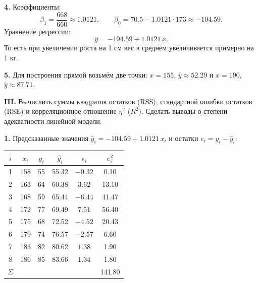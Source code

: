 \documentclass{article}
\begin{document}
    \textbf{4.} Коэффициенты:
    \[\beta_1=\frac{668}{660}\approx1.0121,\qquad \beta_0=70.5-1.0121\cdot173\approx-104.59.\]
    Уравнение регрессии:
    \[\hat y=-104.59+1.0121\,x.\]
    То есть при увеличении роста на 1 см вес в среднем увеличивается примерно на 1 кг.

    \textbf{5.} Для построения прямой возьмём две точки: $x=155$, $\hat y\approx52.29$ и $x=190$, $\hat y\approx87.71$.

    \begin{center}
    \end{center}

\begin{framed}
    \textbf{III.} Вычислить суммы квадратов остатков (RSS), стандартной ошибки остатков (RSE)
    и корреляционное отношение $\eta^2$ ($R^2$). Сделать выводы о степени адекватности линейной модели.
\end{framed}
    \textbf{1.} Предсказанные значения $\hat y_i=-104.59+1.0121\,x_i$ и остатки $e_i=y_i-\hat y_i$:
    \begin{center}
    \begin{tabular}{|c|c|c|c|c|c|}
        \hline
        $i$ & $x_i$ & $y_i$ & $\hat y_i$ & $e_i$ & $e_i^2$ \\ \hline
        1 & 158 & 55 & 55.32 & $-0.32$ & 0.10 \\
        2 & 163 & 64 & 60.38 & $3.62$ & 13.10 \\
        3 & 168 & 59 & 65.44 & $-6.44$ & 41.47 \\
        4 & 172 & 77 & 69.49 & $7.51$ & 56.40 \\
        5 & 175 & 68 & 72.52 & $-4.52$ & 20.43 \\
        6 & 179 & 74 & 76.57 & $-2.57$ & 6.60 \\
        7 & 183 & 82 & 80.62 & $1.38$ & 1.90 \\
        8 & 186 & 85 & 83.66 & $1.34$ & 1.80 \\ \hline
        $\Sigma$ & & & & & 141.80 \\ \hline
    \end{tabular}
    \end{center}
\end{document}
